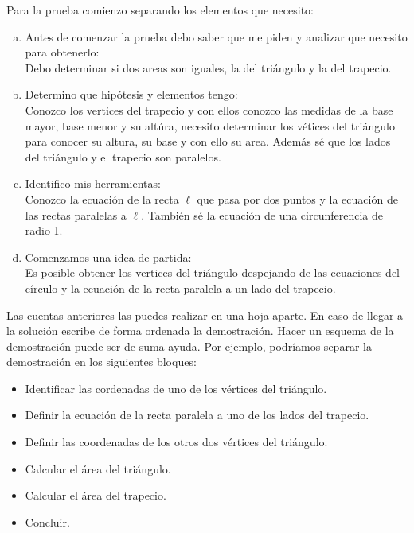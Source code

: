 Para la prueba comienzo separando los elementos que necesito:

\begin{enumerate}[a)]
  \item Antes de comenzar la prueba debo saber que me piden
    y analizar que necesito para obtenerlo:\\
    Debo determinar si dos areas son iguales,
    la del triángulo y la del trapecio.

  \item Determino que hipótesis y elementos tengo:\\
    Conozco los vertices del trapecio
    y con ellos conozco las medidas
    de la base mayor, base menor y su altúra,
    necesito determinar los vétices del triángulo para conocer su altura,
    su base y con ello su area.
    Además sé que los lados del triángulo y el trapecio son paralelos.

  \item Identifico mis herramientas:\\
    Conozco la ecuación de la recta $\ell$ que pasa por dos puntos
    y la ecuación de las rectas paralelas a $\ell.$
    También sé la ecuación de una circunferencia de radio 1.

  \item Comenzamos una idea de partida:\\
    Es posible obtener los vertices del triángulo
    despejando de las ecuaciones del círculo
    y la ecuación de la recta paralela a un lado del trapecio.

\end{enumerate}

Las cuentas anteriores las puedes realizar en una hoja aparte.
En caso de llegar a la solución escribe de forma ordenada la demostración. Hacer un esquema de la demostración puede ser de suma ayuda. Por ejemplo, podríamos separar la demostración en los siguientes bloques:
\begin{itemize}
    \item Identificar las cordenadas de uno de los vértices del triángulo.
    \item Definir la ecuación de la recta paralela a uno de los lados del trapecio.
    \item Definir las coordenadas de los otros dos vértices del triángulo.
    \item Calcular el área del triángulo.
    \item Calcular el área del trapecio.
    \item Concluir.
\end{itemize}

